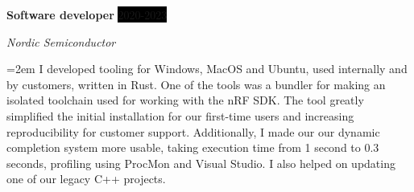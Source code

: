 \documentclass[paper=a4,fontsize=11pt,norsk]{scrartcl} %
\newcommand{\EducationEntry}[4]{
		\noindent \textbf{#1} \hfill      %
		\colorbox{Black}{%
			\parbox{6em}{%
			\hfill\color{White}#2}} \par  %
		\noindent \textit{#3} \par        %
		\noindent\hangindent=2em\hangafter=0 \small #4 %
		\normalsize \par}
\newcommand{\WorkEntry}[4]{				  %
		\noindent \textbf{#1} \hfill      %
		\colorbox{Black}{\color{White}#2} \par  %
		\noindent \textit{#3} \par              %
		\noindent\hangindent=2em\hangafter=0 \small #4 %
		\normalsize \par}
\begin{document}
\WorkEntry{Software developer}{2020-2023}{Nordic Semiconductor}{
I developed tooling for Windows, MacOS and Ubuntu, used internally and by customers, written in Rust. 
One of the tools was a bundler for making an isolated toolchain used for working with the nRF SDK. The tool greatly simplified the initial installation for our first-time users and increasing reproducibility for customer support.  
Additionally, I made our our dynamic completion system more usable, taking execution time from 1 second to 0.3 seconds, profiling using ProcMon and Visual Studio. 
I also helped on updating one of our legacy C++ projects. 
}




\end{document}
